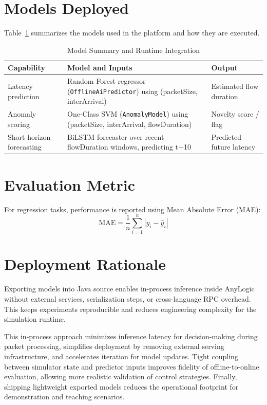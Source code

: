 \section{Models Deployed}

Table~\ref{tab:model_summary} summarizes the models used in the platform and how they are executed.

\begin{table}[H]
\centering
\caption{Model Summary and Runtime Integration}
\label{tab:model_summary}
\begin{tabularx}{\textwidth}{@{}lXl@{}}
\toprule
\textbf{Capability} & \textbf{Model and Inputs} & \textbf{Output} \\
\midrule
Latency prediction & Random Forest regressor (\texttt{OfflineAiPredictor}) using (packetSize, interArrival) \cite{rf} & Estimated flow duration \\
Anomaly scoring & One-Class SVM (\texttt{AnomalyModel}) using (packetSize, interArrival, flowDuration) \cite{ocsvm} & Novelty score / flag \\
Short-horizon forecasting & BiLSTM forecaster over recent flowDuration windows, predicting t+10 & Predicted future latency \\
\bottomrule
\end{tabularx}
\end{table}

\section{Evaluation Metric}

For regression tasks, performance is reported using Mean Absolute Error (MAE):
\begin{equation}
\text{MAE} = \frac{1}{n}\sum_{i=1}^{n}\left|y_i - \hat{y}_i\right|
\end{equation}

\section{Deployment Rationale}

Exporting models into Java source enables in-process inference inside AnyLogic without external services, serialization steps, or cross-language RPC overhead. This keeps experiments reproducible and reduces engineering complexity for the simulation runtime.

This in-process approach minimizes inference latency for decision-making during packet processing, simplifies deployment by removing external serving infrastructure, and accelerates iteration for model updates. Tight coupling between simulator state and predictor inputs improves fidelity of offline-to-online evaluation, allowing more realistic validation of control strategies. Finally, shipping lightweight exported models reduces the operational footprint for demonstration and teaching scenarios.
